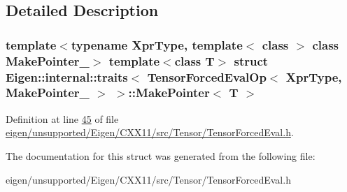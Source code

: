 \subsection{Detailed Description}
\subsubsection*{template$<$typename Xpr\+Type, template$<$ class $>$ class Make\+Pointer\+\_\+$>$\newline
template$<$class T$>$\newline
struct Eigen\+::internal\+::traits$<$ Tensor\+Forced\+Eval\+Op$<$ Xpr\+Type, Make\+Pointer\+\_\+ $>$ $>$\+::\+Make\+Pointer$<$ T $>$}



Definition at line \hyperlink{eigen_2unsupported_2_eigen_2_c_x_x11_2src_2_tensor_2_tensor_forced_eval_8h_source_l00045}{45} of file \hyperlink{eigen_2unsupported_2_eigen_2_c_x_x11_2src_2_tensor_2_tensor_forced_eval_8h_source}{eigen/unsupported/\+Eigen/\+C\+X\+X11/src/\+Tensor/\+Tensor\+Forced\+Eval.\+h}.



The documentation for this struct was generated from the following file\+:\begin{DoxyCompactItemize}
\item 
eigen/unsupported/\+Eigen/\+C\+X\+X11/src/\+Tensor/\+Tensor\+Forced\+Eval.\+h\end{DoxyCompactItemize}

